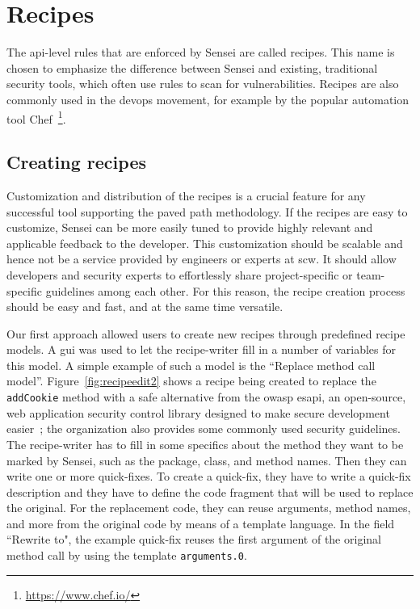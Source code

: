 \section{Recipes}

The \gls{api}-level rules that are enforced by Sensei are called recipes.
This name is chosen to emphasize the difference between Sensei and existing, traditional security tools, which often use rules to scan for vulnerabilities.
Recipes are also commonly used in the \gls{devops} movement, for example by the popular automation tool Chef~\footnote{\url{https://www.chef.io/}}.

\subsection{Creating recipes}
Customization and distribution of the recipes is a crucial feature for any successful tool supporting the paved path methodology.
If the recipes are easy to customize, Sensei can be more easily tuned to provide highly relevant and applicable feedback to the developer.
This customization should be scalable and hence not be a service provided by engineers or experts at \gls{scw}.
It should allow developers and security experts to effortlessly share project-specific or team-specific guidelines among each other.
For this reason, the recipe creation process should be easy and fast, and at the same time versatile. 

Our first approach allowed users to create new recipes through predefined recipe models.
A \gls{gui} was used to let the recipe-writer fill in a number of variables for this model.
A simple example of such a model is  the ``Replace method call model”.
Figure~\ref{fig:recipeedit2} shows a recipe being created to replace the \texttt{addCookie} method with a safe alternative from the \gls{owasp} \gls{esapi}, an open-source, web application security control library designed to make secure development easier~\cite{ESAPI}; the organization also provides some commonly used security guidelines.
The recipe-writer has to fill in some specifics about the method they want to be marked by Sensei, such as the package, class, and method names.
Then they can write one or more quick-fixes.
To create a quick-fix, they have to write a quick-fix description and they have to define the code fragment that will be used to replace the original.
For the replacement code, they can reuse arguments, method names, and more from the original code by means of a template language.
In the field ``Rewrite to", the example quick-fix reuses the first argument of the original method call by using the template \texttt{arguments.0}. 

